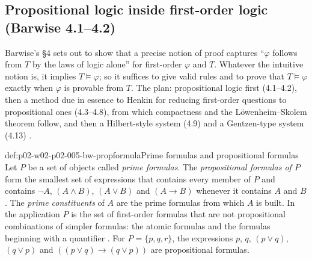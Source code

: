 \subsection{Propositional logic inside first-order logic (Barwise 4.1--4.2)}
\label{sec:p02-w02-p02-005-bw-prop}

Barwise's \S4 sets out to show that a precise notion of proof captures
``\(\varphi\) follows from \(T\) by the laws of logic alone'' for
first-order \(\varphi\) and \(T\).  Whatever the intuitive notion is, it
implies \(T\models\varphi\); so it suffices to give valid rules and to
prove that \(T\models\varphi\) exactly when \(\varphi\) is provable from
\(T\).  The plan: propositional logic first (4.1--4.2), then a method due
in essence to Henkin for reducing first-order questions to propositional
ones (4.3--4.8), from which compactness and the L\"owenheim--Skolem
theorem follow, and then a Hilbert-style system (4.9) and a Gentzen-type
system (4.13) \cite[ch.~A.1, \S4, pp.~22--23]{Barwise1977FirstOrder}.

\begin{hbdefinition}{def:p02-w02-p02-005-bw-propformula}{Prime formulas and propositional formulas}
Let \(P\) be a set of objects called \emph{prime formulas}.  The
\emph{propositional formulas of \(P\)} form the smallest set of
expressions that contains every member of \(P\) and contains \(\neg A\),
\((A\land B)\), \((A\lor B)\) and \((A\to B)\) whenever it contains \(A\)
and \(B\).  The \emph{prime constituents} of \(A\) are the prime formulas
from which \(A\) is built.  In the application \(P\) is the set of
first-order formulas that are not propositional combinations of simpler
formulas: the atomic formulas and the formulas beginning with a quantifier
\cite[ch.~A.1, \S4, p.~23]{Barwise1977FirstOrder}.  For
\(P=\{p,q,r\}\), the expressions \(p\), \(q\), \((p\lor q)\),
\((q\lor p)\) and \(((p\lor q)\to(q\lor p))\) are propositional formulas.
\end{hbdefinition}

